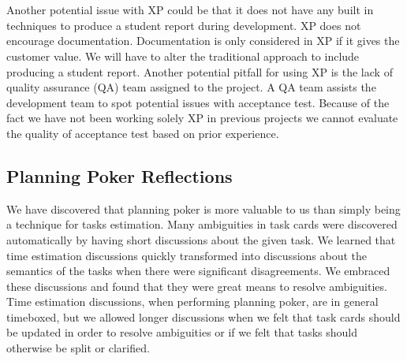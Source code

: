 \\\\
Another potential issue with XP could be that it does not have any built in techniques to produce a student report during development. XP does not encourage documentation. Documentation is only considered in XP if it gives the customer value. We will have to alter the traditional approach to include producing a student report. Another potential pitfall for using XP is the lack of quality assurance (QA) team assigned to the project. A QA team assists the development team to spot potential issues with acceptance test. Because of the fact we have not been working solely XP in previous projects we cannot evaluate the quality of acceptance test based on prior experience.


\subsection{Planning Poker Reflections}

We have discovered that planning poker is more valuable to us than simply being a technique for tasks estimation. Many ambiguities in task cards were discovered automatically by having short discussions about the given task. We learned that time estimation discussions quickly transformed into discussions about the semantics of the tasks when there were significant disagreements. We embraced these discussions and found that they were great means to resolve ambiguities. Time estimation discussions, when performing planning poker, are in general timeboxed, but we allowed longer discussions when we felt that task cards should be updated in order to resolve ambiguities or if we felt that tasks should otherwise be split or clarified.
